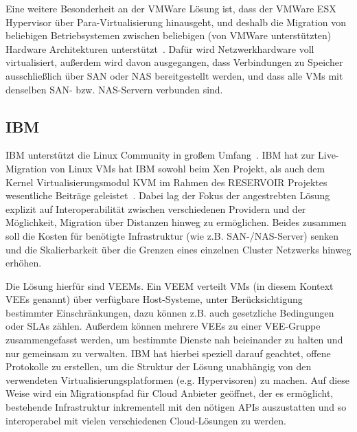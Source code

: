 Eine weitere Besonderheit an der VMWare Lösung ist, dass der VMWare
ESX Hypervisor über Para-Virtualisierung hinausgeht, und deshalb die
Migration von beliebigen Betriebsystemen zwischen beliebigen (von
VMWare unterstützten) Hardware Architekturen
unterstützt~\cite{nelson2005fast}. Dafür wird Netzwerkhardware voll
virtualisiert, außerdem wird davon ausgegangen, dass Verbindungen zu
Speicher ausschließlich über \ac{SAN} oder \ac{NAS} bereitgestellt
werden, und dass alle \ac{VM}s mit denselben \ac{SAN}-
bzw. \ac{NAS}-Servern verbunden sind.

\subsection{IBM}
IBM unterstützt die Linux Community in großem
Umfang~\cite{kroahhartman2007linux}. IBM hat zur Live-Migration von
Linux \ac{VM}s hat IBM sowohl beim Xen Projekt, als auch dem Kernel
Virtualisierungsmodul \ac{KVM} im Rahmen des RESERVOIR Projektes
wesentliche Beiträge geleistet~\cite{rochwerger2009reservoir}. Dabei
lag der Fokus der angestrebten Lösung explizit auf Interoperabilität
zwischen verschiedenen Providern und der Möglichkeit, Migration über
Distanzen hinweg zu ermöglichen. Beides zusammen soll die Kosten für
benötigte Infrastruktur (wie z.B. \ac{SAN}-/\ac{NAS}-Server) senken
und die Skalierbarkeit über die Grenzen eines einzelnen Cluster
Netzwerks hinweg erhöhen.

Die Lösung hierfür sind \ac{VEEM}s. Ein \ac{VEEM} verteilt \ac{VM}s
(in diesem Kontext \ac{VEE}s genannt) über verfügbare Host-Systeme,
unter Berücksichtigung bestimmter Einschränkungen, dazu können
z.B. auch gesetzliche Bedingungen oder \ac{SLA}s zählen. Außerdem
können mehrere \ac{VEE}s zu einer \ac{VEE}-Gruppe zusammengefasst
werden, um bestimmte Dienste nah beieinander zu halten und nur
gemeinsam zu verwalten. IBM hat hierbei speziell darauf geachtet,
offene Protokolle zu erstellen, um die Struktur der Lösung unabhängig
von den verwendeten Virtualisierungsplatformen (e.g. Hypervisoren) zu
machen. Auf diese Weise wird ein Migrationspfad für Cloud Anbieter
geöffnet, der es ermöglicht, bestehende Infrastruktur inkrementell mit
den nötigen \ac{API}s auszustatten und so interoperabel mit vielen
verschiedenen Cloud-Lösungen zu werden.


